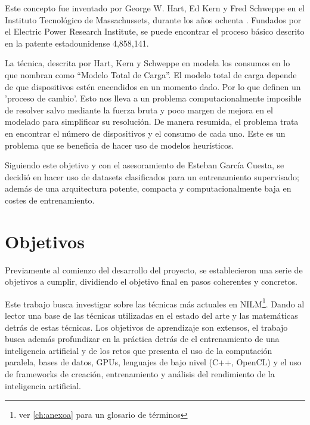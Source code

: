 Este concepto fue inventado por George W. Hart, Ed Kern y Fred Schweppe en el Instituto Tecnológico de Massachussets, durante los años ochenta \autocite{192069}. Fundados por el Electric Power Research Institute, se puede encontrar el proceso básico descrito en la patente estadounidense 4,858,141.

La técnica, descrita por Hart, Kern y Schweppe en \autocite{192069} modela los consumos en lo que nombran como \enquote{Modelo Total de Carga}. El modelo total de carga depende de que dispositivos estén encendidos en un momento dado. Por lo que definen un 'proceso de cambio'.
Esto nos lleva a un problema computacionalmente imposible de resolver salvo mediante la fuerza bruta\autocite[4]{192069} y poco margen de mejora en el modelado para simplificar su resolución. De manera resumida, el problema trata en encontrar el número de dispositivos y el consumo de cada uno. 
Este es un problema que se beneficia de hacer uso de modelos heurísticos.

Siguiendo este objetivo y con el asesoramiento de Esteban García Cuesta, se decidió en hacer uso de datasets clasificados para un entrenamiento supervisado; además de una arquitectura potente, compacta y computacionalmente baja en costes de entrenamiento. 




\section{Objetivos}
\label{sec:objetivos}
Previamente al comienzo del desarrollo del proyecto, se establecieron una serie de objetivos a cumplir, dividiendo el objetivo final en pasos coherentes y concretos.

Este trabajo busca investigar sobre las técnicas más actuales en NILM\footnote{ver \autoref{ch:anexoa} para un glosario de términos}. Dando al lector una base de las técnicas utilizadas en el estado del arte y las matemáticas detrás de estas técnicas.
Los objetivos de aprendizaje son extensos, el trabajo busca además profundizar en la práctica detrás de el entrenamiento de una inteligencia artificial y de los retos que presenta el uso de la computación paralela, bases de datos, GPUs, lenguajes de bajo nivel (C++, OpenCL) y el uso de frameworks de creación, entrenamiento y análisis del rendimiento de la inteligencia artificial.


